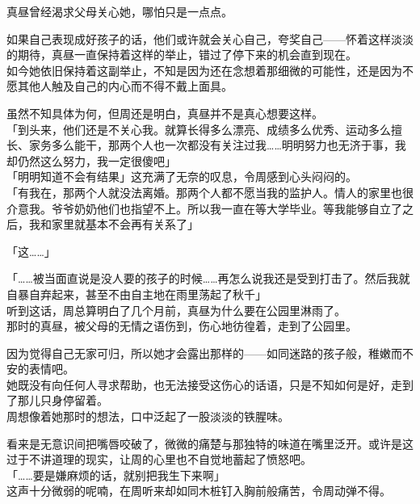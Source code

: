 真昼曾经渴求父母关心她，哪怕只是一点点。

如果自己表现成好孩子的话，他们或许就会关心自己，夸奖自己——怀着这样淡淡的期待，真昼一直保持着这样的举止，错过了停下来的机会直到现在。\\

如今她依旧保持着这副举止，不知是因为还在念想着那细微的可能性，还是因为不愿其他人触及自己的内心而不得不戴上面具。

虽然不知具体为何，但周还是明白，真昼并不是真心想要这样。\\

「到头来，他们还是不关心我。就算长得多么漂亮、成绩多么优秀、运动多么擅长、家务多么能干，那两个人也一次都没有关注过我……明明努力也无济于事，我却仍然这么努力，我一定很傻吧」\\

「明明知道不会有结果」这充满了无奈的叹息，令周感到心头闷闷的。\\

「有我在，那两个人就没法离婚。那两个人都不愿当我的监护人。情人的家里也很介意我。爷爷奶奶他们也指望不上。所以我一直在等大学毕业。等我能够自立了之后，我和家里就基本不会再有关系了」

「这……」

「……被当面直说是没人要的孩子的时候……再怎么说我还是受到打击了。然后我就自暴自弃起来，甚至不由自主地在雨里荡起了秋千」\\

听到这话，周总算明白了几个月前，真昼为什么要在公园里淋雨了。\\

那时的真昼，被父母的无情之语伤到，伤心地彷徨着，走到了公园里。

因为觉得自己无家可归，所以她才会露出那样的——如同迷路的孩子般，稚嫩而不安的表情吧。\\

她既没有向任何人寻求帮助，也无法接受这伤心的话语，只是不知如何是好，走到了那儿只身停留着。\\

周想像着她那时的想法，口中泛起了一股淡淡的铁腥味。

看来是无意识间把嘴唇咬破了，微微的痛楚与那独特的味道在嘴里泛开。或许是这过于不讲道理的现实，让周的心里也不自觉地蓄起了愤怒吧。\\

「……要是嫌麻烦的话，就别把我生下来啊」\\

这声十分微弱的呢喃，在周听来却如同木桩钉入胸前般痛苦，令周动弹不得。\\

